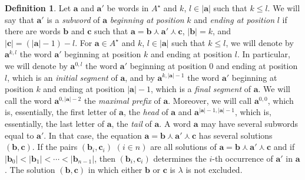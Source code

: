 \documentclass[a4paper, reqno
]{amsart}
\DeclareMathOperator{\bconcat}{\curlywedge}
\newcommand{\bb}[1]{\ensuremath{\lvert #1 \rvert}}
\theoremstyle{plain}
\theoremstyle{definition}
\newtheorem{definition}[theorem]{Definition}
\begin{document}
\begin{definition}\label{DSubw}
Let $\mathbf{a}$ and $\mathbf{a}'$ be words in $A^{\star}$ and $k$, $l\in\bb{\mathbf{a}}$ such that $k\leq l$.
We will say that $\mathbf{a}'$ is a \emph{subword} of $\mathbf{a}$ \emph{beginning at position} $k$ and \emph{ending at position} $l$ if there are words $\mathbf{b}$ and $\mathbf{c}$ such that $\mathbf{a} = \mathbf{b}\bconcat \mathbf{a}'\bconcat \mathbf{c}$, $\bb{\mathbf{b}} = k$, and $\bb{\mathbf{c}} = (\bb{\mathbf{a}}-1)-l$.
For $\mathbf{a}\in A^{\star}$ and $k$, $l\in\bb{\mathbf{a}}$ such that $k\leq l$, we will denote by $\mathbf{a}^{k,l}$ the word $\mathbf{a}'$ beginning at position $k$ and ending at position $l$.
In particular, we will denote by $\mathbf{a}^{0,l}$ the word $\mathbf{a}'$ beginning at position $0$ and ending at position $l$, which is an \emph{initial segment} of $\mathbf{a}$, and by $\mathbf{a}^{k,\bb{\mathbf{a}}-1}$ the word $\mathbf{a}'$ beginning at position $k$ and ending at position $\bb{\mathbf{a}}-1$, which is a \emph{final segment} of $\mathbf{a}$.
We will call the word $\mathbf{a}^{0,\bb{\mathbf{a}}-2}$ the \emph{maximal prefix} of $\mathbf{a}$.
Moreover, we will call $\mathbf{a}^{0,0}$, which is, essentially, the first letter of $\mathbf{a}$, the \emph{head} of $\mathbf{a}$ and $\mathbf{a}^{\bb{\mathbf{a}}-1,\bb{\mathbf{a}}-1}$, which is, essentially, the last letter of $\mathbf{a}$, the \emph{tail} of $\mathbf{a}$.
A word $\mathbf{a}$ may have several subwords equal to $\mathbf{a}'$.
In that case, the equation $\mathbf{a} = \mathbf{b}\bconcat \mathbf{a}'\bconcat \mathbf{c}$ has several solutions $(\mathbf{b},\mathbf{c})$.
If the pairs $(\mathbf{b}_{i},\mathbf{c}_{i})$ $(i\in n)$ are all solutions of $\mathbf{a} = \mathbf{b}\bconcat \mathbf{a}'\bconcat \mathbf{c}$ and if $\bb{\mathbf{b}_{0}}< \bb{\mathbf{b}_{1}}<\cdots<\bb{\mathbf{b}_{n-1}}$, then $(\mathbf{b}_{i},\mathbf{c}_{i})$ determines the $i$-th occurrence of $\mathbf{a}'$ in $\mathbf{a}$.
The solution $(\mathbf{b},\mathbf{c})$ in which either $\mathbf{b}$ or $\mathbf{c}$ is $\lambda$ is not excluded.


\end{definition}
\end{document}

